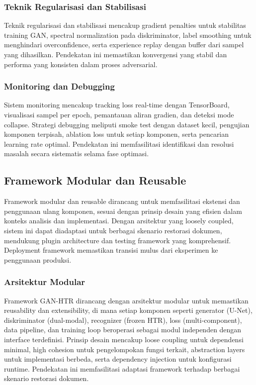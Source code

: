 \documentclass[12pt,a4paper]{article}
\begin{document}
\subsubsection{Teknik Regularisasi dan Stabilisasi}
\label{subsubsec:regularisasi-stabilisasi}

Teknik regularisasi dan stabilisasi mencakup gradient penalties untuk stabilitas training GAN, spectral normalization pada diskriminator, label smoothing untuk menghindari overconfidence, serta experience replay dengan buffer dari sampel yang dihasilkan. Pendekatan ini memastikan konvergensi yang stabil dan performa yang konsisten dalam proses adversarial.

\subsubsection{Monitoring dan Debugging}
\label{subsubsec:monitoring-debugging}

Sistem monitoring mencakup tracking loss real-time dengan TensorBoard, visualisasi sampel per epoch, pemantauan aliran gradien, dan deteksi mode collapse. Strategi debugging meliputi smoke test dengan dataset kecil, pengujian komponen terpisah, ablation loss untuk setiap komponen, serta pencarian learning rate optimal. Pendekatan ini memfasilitasi identifikasi dan resolusi masalah secara sistematis selama fase optimasi.

\subsection{Framework Modular dan Reusable}
\label{subsec:framework-modular}

Framework modular dan reusable dirancang untuk memfasilitasi ekstensi dan penggunaan ulang komponen, sesuai dengan prinsip desain yang efisien dalam konteks analisis dan implementasi. Dengan arsitektur yang loosely coupled, sistem ini dapat diadaptasi untuk berbagai skenario restorasi dokumen, mendukung plugin architecture dan testing framework yang komprehensif. Deployment framework memastikan transisi mulus dari eksperimen ke penggunaan produksi.

\subsubsection{Arsitektur Modular}
\label{subsubsec:arsitektur-modular}

Framework GAN-HTR dirancang dengan arsitektur modular untuk memastikan reusability dan extensibility, di mana setiap komponen seperti generator (U-Net), diskriminator (dual-modal), recognizer (frozen HTR), loss (multi-component), data pipeline, dan training loop beroperasi sebagai modul independen dengan interface terdefinisi. Prinsip desain mencakup loose coupling untuk dependensi minimal, high cohesion untuk pengelompokan fungsi terkait, abstraction layers untuk implementasi berbeda, serta dependency injection untuk konfigurasi runtime. Pendekatan ini memfasilitasi adaptasi framework terhadap berbagai skenario restorasi dokumen.
\end{document}
